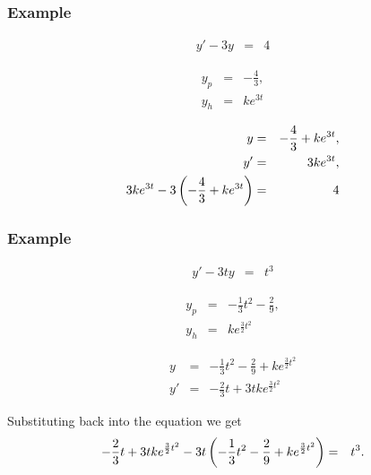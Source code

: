 \begin{frame}
  \frametitle{Example}

  \begin{eqnarray*}
    y' - 3y & = & 4
  \end{eqnarray*}

  \begin{eqnarray*}
    y_p & = & -\frac{4}{3}, \\
    y_h & = & k e^{3t}
  \end{eqnarray*}

  \begin{eqnarray*}
    y & = & -\frac{4}{3} + k e^{3t}, \\
    y' & = & 3 k e^{3t}, \\
    3 k e^{3t} - 3 \left( -\frac{4}{3} + k e^{3t} \right) & = & 4
  \end{eqnarray*}


\end{frame}


\begin{frame}
  \frametitle{Example}

  \begin{eqnarray*}
    y' - 3ty & = & t^3
  \end{eqnarray*}

  \begin{eqnarray*}
    y_p & = & -\frac{1}{3} t^2 - \frac{2}{9}, \\
    y_h & = & k e^{\frac{3}{2}t^2}
  \end{eqnarray*}

  \begin{eqnarray*}
    y & = & -\frac{1}{3} t^2 - \frac{2}{9} + k e^{\frac{3}{2}t^2} \\
    y' & = & -\frac{2}{3} t + 3t k e^{\frac{3}{2}t^2} 
  \end{eqnarray*}

  Substituting back into the equation we get
  \begin{eqnarray*}
    -\frac{2}{3} t + 3t k e^{\frac{3}{2}t^2} - 3t \left( -\frac{1}{3} t^2 - \frac{2}{9} + k e^{\frac{3}{2}t^2} \right) & = & t^3.
  \end{eqnarray*}

\end{frame}


